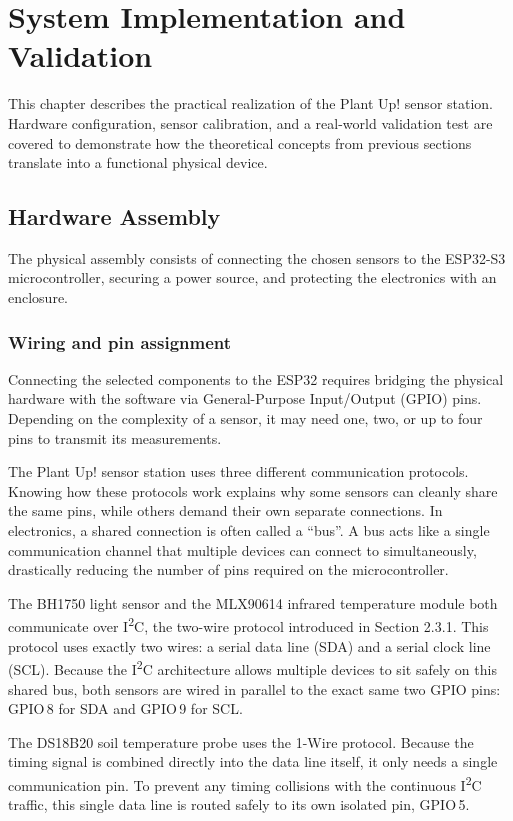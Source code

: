 \section{System Implementation and Validation}

This chapter describes the practical realization of the Plant Up! sensor station. Hardware configuration, sensor calibration, and a real-world validation test are covered to demonstrate how the theoretical concepts from previous sections translate into a functional physical device.

\subsection{Hardware Assembly}

The physical assembly consists of connecting the chosen sensors to the ESP32-S3 microcontroller, securing a power source, and protecting the electronics with an enclosure.

\subsubsection*{Wiring and pin assignment}

Connecting the selected components to the ESP32 requires bridging the physical hardware with the software via General-Purpose Input/Output (GPIO) pins. Depending on the complexity of a sensor, it may need one, two, or up to four pins to transmit its measurements.

The Plant Up! sensor station uses three different communication protocols. Knowing how these protocols work explains why some sensors can cleanly share the same pins, while others demand their own separate connections. In electronics, a shared connection is often called a ``bus''. A bus acts like a single communication channel that multiple devices can connect to simultaneously, drastically reducing the number of pins required on the microcontroller. 

The BH1750 light sensor and the MLX90614 infrared temperature module both communicate over I\textsuperscript{2}C, the two-wire protocol introduced in Section 2.3.1. This protocol uses exactly two wires: a serial data line (SDA) and a serial clock line (SCL). Because the I\textsuperscript{2}C architecture allows multiple devices to sit safely on this shared bus, both sensors are wired in parallel to the exact same two GPIO pins: GPIO\,8 for SDA and GPIO\,9 for SCL. 

The DS18B20 soil temperature probe uses the 1-Wire protocol. Because the timing signal is combined directly into the data line itself, it only needs a single communication pin. To prevent any timing collisions with the continuous I\textsuperscript{2}C traffic, this single data line is routed safely to its own isolated pin, GPIO\,5.

